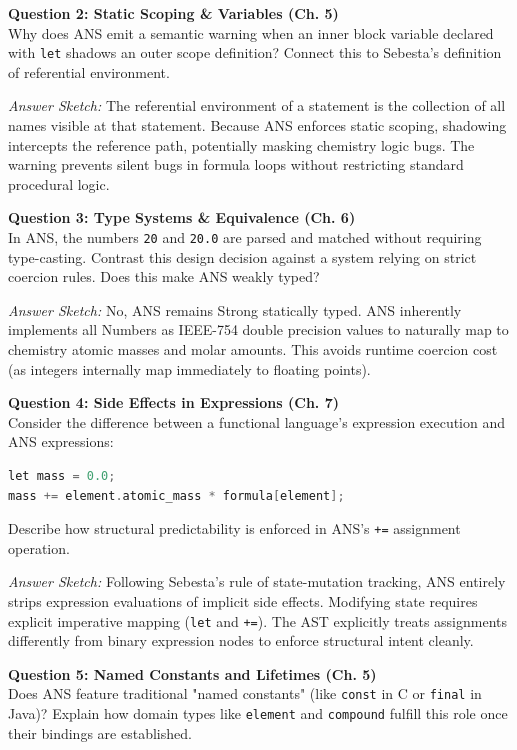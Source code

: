 \documentclass[11pt,a4paper]{article}
\newcommand{\code}[1]{\texttt{#1}}
\begin{document}
\vspace{10pt}
\textbf{Question 2: Static Scoping \& Variables (Ch. 5)} \\
Why does ANS emit a semantic warning when an inner block variable declared with \code{let} shadows an outer scope definition? Connect this to Sebesta's definition of referential environment.

\textit{Answer Sketch:} The referential environment of a statement is the collection of all names visible at that statement. Because ANS enforces static scoping, shadowing intercepts the reference path, potentially masking chemistry logic bugs. The warning prevents silent bugs in formula loops without restricting standard procedural logic.

\vspace{10pt}
\textbf{Question 3: Type Systems \& Equivalence (Ch. 6)} \\
In ANS, the numbers \code{20} and \code{20.0} are parsed and matched without requiring type-casting. Contrast this design decision against a system relying on strict coercion rules. Does this make ANS weakly typed?

\textit{Answer Sketch:} No, ANS remains Strong statically typed. ANS inherently implements all Numbers as IEEE-754 double precision values to naturally map to chemistry atomic masses and molar amounts. This avoids runtime coercion cost (as integers internally map immediately to floating points).

\vspace{10pt}
\textbf{Question 4: Side Effects in Expressions (Ch. 7)} \\
Consider the difference between a functional language's expression execution and ANS expressions:
\begin{lstlisting}[language=C]
let mass = 0.0;
mass += element.atomic_mass * formula[element];
\end{lstlisting}
Describe how structural predictability is enforced in ANS's \code{+=} assignment operation. 

\textit{Answer Sketch:} Following Sebesta's rule of state-mutation tracking, ANS entirely strips expression evaluations of implicit side effects. Modifying state requires explicit imperative mapping (\code{let} and \code{+=}). The AST explicitly treats assignments differently from binary expression nodes to enforce structural intent cleanly.

\vspace{10pt}
\textbf{Question 5: Named Constants and Lifetimes (Ch. 5)} \\
Does ANS feature traditional "named constants" (like \code{const} in C or \code{final} in Java)? Explain how domain types like \code{element} and \code{compound} fulfill this role once their bindings are established.
\end{document}
